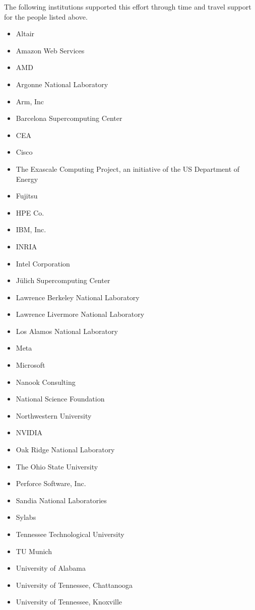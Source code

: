 The following institutions supported this effort through time and travel support for the people listed above.

\begin{itemize}
    \item Altair
    \item Amazon Web Services
    \item AMD
    \item Argonne National Laboratory
    \item Arm, Inc
    \item Barcelona Supercomputing Center
    \item CEA
    \item Cisco
    \item The Exascale Computing Project, an initiative of the US Department of Energy
    \item Fujitsu
    \item HPE Co.
    \item IBM, Inc.
    \item INRIA
    \item Intel Corporation
    \item Jülich Supercomputing Center
    \item Lawrence Berkeley National Laboratory
    \item Lawrence Livermore National Laboratory
    \item Los Alamos National Laboratory
    \item Meta
    \item Microsoft
    \item Nanook Consulting
    \item National Science Foundation
    \item Northwestern University
    \item NVIDIA
    \item Oak Ridge National Laboratory
    \item The Ohio State University
    \item Perforce Software, Inc.
    \item Sandia National Laboratories
    \item Sylabs
    \item Tennessee Technological University
    \item TU Munich
    \item University of Alabama
    \item University of Tennessee, Chattanooga
    \item University of Tennessee, Knoxville
\end{itemize}

